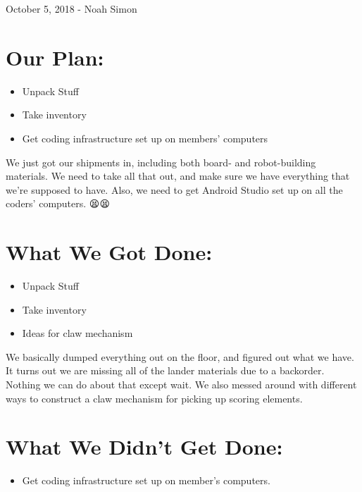 \documentclass[12pt]{article}
\begin{document}
October 5, 2018 - Noah Simon

\section{Our Plan:} %
\begin{itemize}
	\item Unpack Stuff
	\item Take inventory
	\item Get coding infrastructure set up on members' computers
\end{itemize}

We just got our shipments in, including both board- and robot-building materials. We need to take all that out, and make sure we have everything that we're supposed to have. Also, we need to get Android Studio set up on all the coders' computers. 😫😫

\section{What We Got Done:} %
\begin{itemize}
	\item Unpack Stuff
	\item Take inventory
	\item Ideas for claw mechanism
\end{itemize}

We basically dumped everything out on the floor, and figured out what we have. It turns out we are missing all of the lander materials due to a backorder. Nothing we can do about that except wait. We also messed around with different ways to construct a claw mechanism for picking up scoring elements.

\section{What We Didn't Get Done:} %
\begin{itemize}
	\item Get coding infrastructure set up on member's computers.
\end{itemize}
\end{document}
